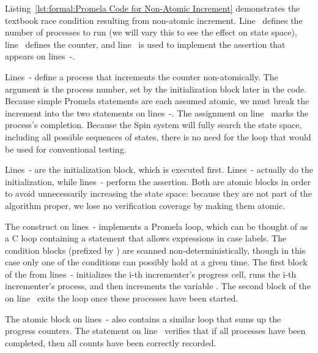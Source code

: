 \begin{lineref}
Listing~\ref{lst:formal:Promela Code for Non-Atomic Increment}
demonstrates the textbook race condition
resulting from non-atomic increment.
Line~ defines the number of processes to run (we will vary this
to see the effect on state space), line~ defines the counter,
and line~ is used to implement the assertion that appears on
lines~-.

Lines~- define a process that increments
the counter non-atomically.
The argument  is the process number, set by the initialization
block later in the code.
Because simple Promela statements are each assumed atomic, we must
break the increment into the two statements on
lines~-.
The assignment on line~ marks the process's completion.
Because the Spin system will fully search the state space, including
all possible sequences of states, there is no need for the loop
that would be used for conventional testing.

Lines~- are the initialization block,
which is executed first.
Lines~- actually do the initialization,
while lines~-
perform the assertion.
Both are atomic blocks in order to avoid unnecessarily increasing
the state space: because they are not part of the algorithm proper,
we lose no verification coverage by making them atomic.

The  construct on lines~-
implements a Promela loop,
which can be thought of as a C  loop containing a
 statement that allows expressions in case labels.
The condition blocks (prefixed by \co{::})
are scanned non-deterministically,
though in this case only one of the conditions can possibly hold at a given
time.
The first block of the  from
lines~-
initializes the i-th
incrementer's progress cell, runs the i-th incrementer's process, and
then increments the variable .
The second block of the  on
line~ exits the loop once
these processes have been started.

The atomic block on lines~- also contains
a similar 
loop that sums up the progress counters.
The  statement on line~ verifies that
if all processes
have been completed, then all counts have been correctly recorded.
\end{lineref}

